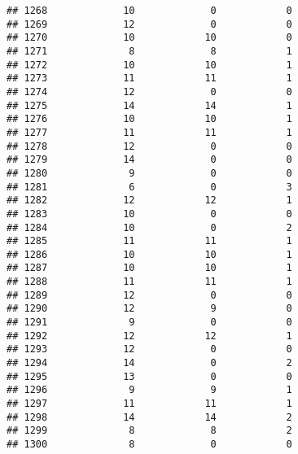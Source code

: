 \documentclass[
]{article}
\begin{document}
\begin{verbatim}
## 1268             10             0            0
## 1269             12             0            0
## 1270             10            10            0
## 1271              8             8            1
## 1272             10            10            1
## 1273             11            11            1
## 1274             12             0            0
## 1275             14            14            1
## 1276             10            10            1
## 1277             11            11            1
## 1278             12             0            0
## 1279             14             0            0
## 1280              9             0            0
## 1281              6             0            3
## 1282             12            12            1
## 1283             10             0            0
## 1284             10             0            2
## 1285             11            11            1
## 1286             10            10            1
## 1287             10            10            1
## 1288             11            11            1
## 1289             12             0            0
## 1290             12             9            0
## 1291              9             0            0
## 1292             12            12            1
## 1293             12             0            0
## 1294             14             0            2
## 1295             13             0            0
## 1296              9             9            1
## 1297             11            11            1
## 1298             14            14            2
## 1299              8             8            2
## 1300              8             0            0
\end{verbatim}
\end{document}
